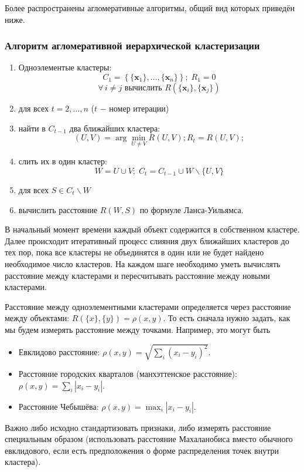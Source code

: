 \documentclass[10pt]{article}
\begin{document}
	Более распространены агломеративные алгоритмы, общий вид которых приведён ниже. 

	
	\subsubsection*{Алгоритм агломеративной иерархической кластеризации}
	\begin{enumerate}
		\item Одноэлементые кластеры: $$C_1 = \left\{\{\pmb x_1\}, \dots, \{\pmb x_n\}\right\}; \; R_1 = 0$$ $$\forall\, i \neq j \text{ вычислить } R(\{\pmb x_i\}, \{\pmb x_j\})$$ 
		\item для всех $t = 2, \dots, n$ ($t$ $-$ номер итерации) 
		\item найти в $C_{t-1}$ два ближайших кластера: $$(U, V) = \arg \min_{U \neq V} R(U, V); R_t=R(U, V);$$
		\item слить их в один кластер: $$W = U \cup V; \; C_t = C_{t-1} \cup W \backslash \{U, V\}$$ 
		\item для всех $S \in C_t \backslash W $ 
		\item вычислить расстояние $R(W, S)$ по формуле Ланса-Уильямса.
	\end{enumerate}

В начальный момент времени каждый объект содержится в собственном кластере. Далее происходит итеративный процесс слияния двух ближайших кластеров до тех пор, пока все кластеры не объединятся в один или не будет найдено необходимое число кластеров. На каждом шаге необходимо уметь вычислять расстояние между кластерами и пересчитывать расстояние между новыми кластерами. 

Расстояние между одноэлементными кластерами определяется через расстояние между объектами: $R(\{x\}, \{y\})= \rho(x,y)$. То есть сначала нужно задать, как мы будем измерять расстояние между точками. Например, это могут быть
\begin{itemize}
	\item Евклидово расстояние: $\rho(x,y) = \sqrt{\sum_i (x_i - y_i)^2}$.
	\item Расстояние городских кварталов (манхэттенское расстояние):  $\rho(x,y) = \sum_i |x_i - y_i|$.
	\item Расстояние Чебышёва: $\rho(x,y) = \max_i |x_i - y_i|$.
\end{itemize}
Важно либо исходно стандартизовать признаки, либо измерять расстояние
специальным образом (использовать расстояние Махаланобиса вместо обычного евклидового, если есть предположения о форме распределения точек внутри кластера).
\end{document}
